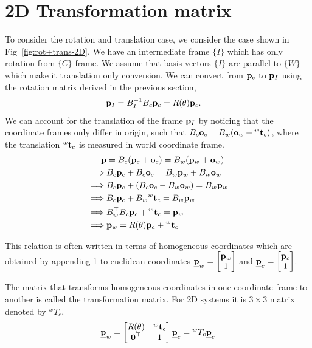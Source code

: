 \documentclass[twocolumn]{article}
\begin{document}
\section{2D Transformation matrix}

To consider the rotation and  translation case, we consider  the case shown in Fig~\ref{fig:rot+trans-2D}.
We have  an  intermediate frame $\{I\}$ which has only  rotation from $\{C\}$
frame. We assume that basis   vectors  $\{I\}$ are parallel to $\{W\}$ which
make it translation only conversion. We can convert  from $\mathbf{p}_c$ to $\mathbf{p}_I$
using  the rotation   matrix  derived  in the previous section,
%
\begin{align}
  \mathbf{p}_I  &=  B_I^{-1} B_c \mathbf{p}_c = R(\theta) \mathbf{p}_c.
\end{align}
%
We can account  for the  translation of the frame $\mathbf{p}_I$ by noticing that the
coordinate frames only  differ  in  origin, such that $B_c\mathbf{o}_c =  B_w(\mathbf{o}_w +
{}^w\mathbf{t}_c)$, where   the  translation ${}^w\mathbf{t}_c$ is  measured in  world
coordinate  frame.
\begin{align}
  \mathbf{p}  &=   B_c (\mathbf{p}_c + \mathbf{o}_c) =   B_w (\mathbf{p}_w  +  \mathbf{o}_w)
  \notag\\
  \implies   &B_c \mathbf{p}_c + B_c \mathbf{o}_c =   B_w \mathbf{p}_w  +  B_w \mathbf{o}_w
\notag\\
  \implies   &B_c \mathbf{p}_c + (B_c \mathbf{o}_c -  B_w \mathbf{o}_w)  =   B_w \mathbf{p}_w  
\notag\\
  \implies   &B_c \mathbf{p}_c + B_w {}^w\mathbf{t}_c  =   B_w \mathbf{p}_w  
\notag\\
  \implies   &B_w^{\top}  B_c \mathbf{p}_c + {}^w\mathbf{t}_c  =   \mathbf{p}_w  
\notag\\
  \implies   &\mathbf{p}_w = R(\theta) \mathbf{p}_c + {}^w\mathbf{t}_c
\end{align}

\newcommand{\ubfp}{\underline{\bfp}}
This relation is often written  in  terms of homogeneous   coordinates  which
are   obtained by  appending 1 to euclidean coordinates  $\ubfp_w
= \begin{bmatrix}
  \bfp_w \\ 1   \end{bmatrix}$ and  $\ubfp_c
= \begin{bmatrix}
  \bfp_c \\ 1   \end{bmatrix}$.

The matrix that transforms homogeneous coordinates in one  coordinate  frame to
another is called the transformation matrix. For  2D  systems it is  $3 \times
3$ matrix denoted  by ${}^wT_c$,
%
\begin{align}
  \ubfp_w = \begin{bmatrix}
    R(\theta) & {}^w\bft_c  \\
    \boldsymbol{0}^\top &  1
  \end{bmatrix}  \ubfp_c  = {}^wT_c \ubfp_c
\end{align}
%
\end{document}
